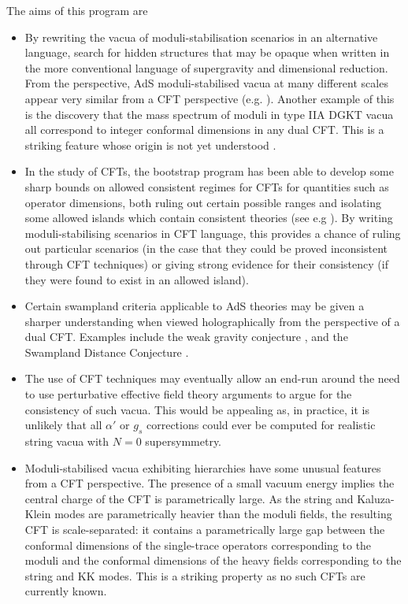 The aims of this program are
\begin{itemize}
\item
By rewriting the vacua of moduli-stabilisation scenarios in an alternative language, search for hidden structures that may be opaque when written in the more conventional language of supergravity and dimensional reduction. From the perspective, AdS moduli-stabilised vacua at many different scales appear very similar from a CFT perspective (e.g. \cite{Conlon:2018vov, Conlon:2020wmc} ). Another example of this is the discovery that the mass spectrum of moduli in type IIA DGKT vacua all correspond to integer conformal dimensions in any dual CFT. This is a striking feature whose origin is not yet understood \cite{Conlon:2021cjk, Apers:2022tfm, Apers:2022zjx, Quirant:2022fpn, QuirantPellin:2022vyp, Plauschinn:2022ztd, Apers:2022vfp}.

\item
In the study of CFTs, the bootstrap program has been able to develop some sharp bounds on allowed consistent regimes for CFTs for quantities such as operator dimensions, both ruling out certain possible ranges and isolating some allowed islands which contain consistent theories (see e.g \cite{Simmons-Duffin:2016gjk}). By writing moduli-stabilising scenarios in CFT language, this provides a chance of ruling out particular scenarios (in the case that they could be proved inconsistent through CFT techniques) or giving strong evidence for their consistency (if they were found to exist in an allowed island).

\item Certain swampland criteria applicable to AdS theories may be given a sharper understanding when viewed holographically from the perspective of a dual CFT. Examples include the weak gravity conjecture \cite{Montero:2018fns, Furuuchi:2017upe, Harlow:2018tng, Andriolo:2020lul, Aharony:2021mpc, Palti:2022unw}, and the Swampland Distance Conjecture \cite{Baume:2020dqd, Perlmutter:2020buo}.

\item
The use of CFT techniques may eventually allow an end-run around the need to use perturbative effective field theory arguments to argue for the consistency of such vacua. This would be appealing as, in practice, it is unlikely that all $\alpha'$ or $g_s$ corrections could ever be computed for realistic string vacua with $N=0$ supersymmetry.

\item
Moduli-stabilised vacua exhibiting hierarchies have some unusual features from a CFT perspective. The presence of a small vacuum energy implies the central charge of the CFT is parametrically large. As the string and Kaluza-Klein modes are parametrically heavier than the moduli fields, the resulting CFT is scale-separated: it contains a parametrically large gap between the conformal dimensions of the single-trace operators corresponding to the moduli and the conformal dimensions of the heavy fields corresponding to the string and KK modes. This is a striking property as no such CFTs are currently known.


\end{itemize}
